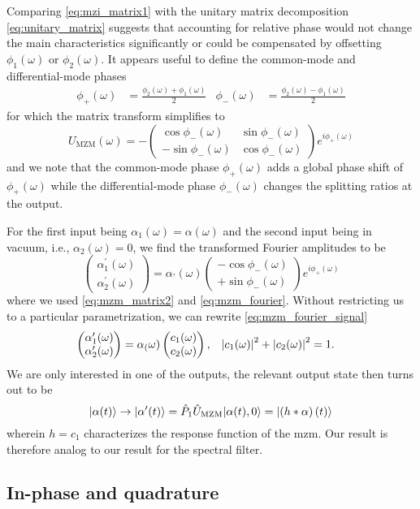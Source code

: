 Comparing \cref{eq:mzi_matrix1} with the unitary matrix decomposition \cref{eq:unitary_matrix} suggests that accounting for relative phase would not change the main characteristics significantly or could be compensated by offsetting $\phi_1(\omega)$ or $\phi_2(\omega)$.
It appears useful to define the common-mode and differential-mode phases
\begin{align}
	\phi_+(\omega)
	&=
	\frac{\phi_2(\omega)+\phi_1(\omega)}{2}
	&
	\phi_-(\omega)
	&=
	\frac{\phi_2(\omega)-\phi_1(\omega)}{2}
\end{align}
for which the matrix transform simplifies to
\begin{equation}
	U_\text{MZM}(\omega)
	=
	-
	\begin{pmatrix}
		\cos\phi_-(\omega) & \sin\phi_-(\omega) \\
		-\sin\phi_-(\omega) & \cos\phi_-(\omega)
	\end{pmatrix}
	e^{i\phi_+(\omega)}
	\label{eq:mzm_matrix2}
\end{equation}
and we note that the common-mode phase $\phi_+(\omega)$ adds a global phase shift of $\phi_+(\omega)$ while the differential-mode phase $\phi_-(\omega)$ changes the splitting ratios at the output.

For the first input being $\alpha_1(\omega)=\alpha(\omega)$ and the second input being in vacuum, i.e., $\alpha_2(\omega)=0$, we find the transformed Fourier amplitudes to be
\begin{equation}
	\begin{pmatrix}
		\alpha_1^\prime(\omega) \\
		\alpha_2^\prime(\omega)
	\end{pmatrix}
	=
	\alpha_\prime(\omega)
	\begin{pmatrix}
		-\cos\phi_-(\omega) \\
		+\sin\phi_-(\omega)
	\end{pmatrix}
	e^{i\phi_+(\omega)}
	\label{eq:mzm_fourier_signal}
\end{equation}
where we used \cref{eq:mzm_matrix2} and \cref{eq:mzm_fourier}.
Without restricting us to a particular parametrization, we can rewrite \cref{eq:mzm_fourier_signal}
\begin{align}
	\begin{pmatrix}
		\alpha_1^\prime(\omega) \\
		\alpha_2^\prime(\omega)
	\end{pmatrix}
	&=
	\alpha_(\omega)
	\begin{pmatrix}
		c_1(\omega) \\
		c_2(\omega)
	\end{pmatrix}
	,
	&
	\abs*{c_1(\omega)}^2
	+
	\abs*{c_2(\omega)}^2
	&=
	1
	.
\end{align}
We are only interested in one of the outputs, the relevant output state then turns out to be
\begin{equation}
	\ket{\alpha(t)}
	\to
	\ket*{\alpha^\prime(t)}
	=
	\hat{P}_1
	\hat{U}_\text{MZM}
	\ket*{\alpha(t),0}
	=
	\ket*{\left(h*\alpha\right)(t)}
	\label{eq:mzm_state}
\end{equation}
wherein $h=c_1$ characterizes the response function of the \gls{mzm}.
Our result is therefore analog to our result for the spectral filter.

\subsection{In-phase and quadrature}